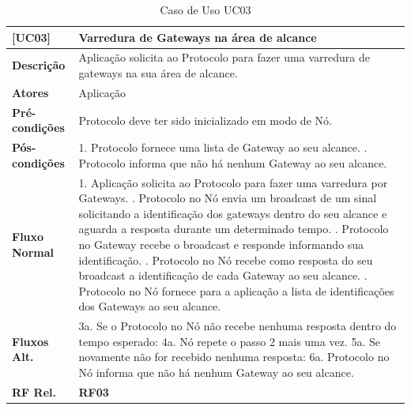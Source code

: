 \begin{longtable}{|p{2.65cm}|p{13cm}|}
    \caption{Caso de Uso UC03}\label{tab:use-cases03} \\
    \hline
    \textbf{[UC03]} & Varredura de Gateways na área de alcance \\
    \hline
    \textbf{Descrição} & Aplicação solicita ao Protocolo para fazer uma varredura de gateways na sua área de alcance. \\
    \hline
    \textbf{Atores} & Aplicação \\
    \hline
    \textbf{Pré-condições} & Protocolo deve ter sido inicializado em modo de Nó. \\
    \hline
    \textbf{Pós-condições} & 1. Protocolo fornece uma lista de Gateway ao seu alcance. \newline
    2. Protocolo informa que não há nenhum Gateway ao seu alcance. \\
    \hline
    \textbf{Fluxo Normal} & 1. Aplicação solicita ao Protocolo para fazer uma varredura por Gateways. \newline
    2. Protocolo no Nó envia um broadcast de um sinal solicitando a identificação dos gateways dentro do seu alcance e aguarda a resposta durante um determinado tempo. \newline
    3. Protocolo no Gateway recebe o broadcast e responde informando sua identificação. \newline
    4. Protocolo no Nó recebe como resposta do seu broadcast a identificação de cada Gateway ao seu alcance. \newline
    5. Protocolo no Nó fornece para a aplicação a lista de identificações dos Gateways ao seu alcance.\\
    \hline
    \textbf{Fluxos Alt.} & 3a. Se o Protocolo no Nó não recebe nenhuma resposta dentro do tempo esperado: \newline
    4a. Nó repete o passo 2 mais uma vez. \newline
    5a. Se novamente não for recebido nenhuma resposta: \newline
    6a. Protocolo no Nó informa que não há nenhum Gateway ao seu alcance. \\
    \hline
    \textbf{RF Rel.} & \textbf{RF03} \\
    \hline
\end{longtable}

